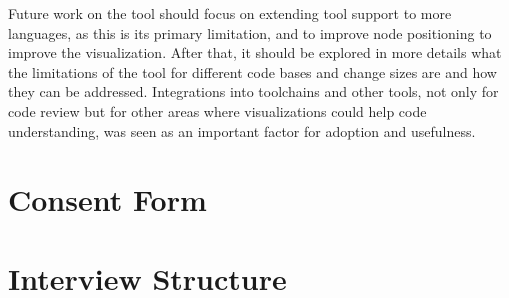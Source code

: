 \documentclass[a4paper,11pt,twoside]{article}
\theoremstyle{definition} %
\begin{document}
Future work on the tool should focus on extending tool support to more languages, as this is its primary limitation, and to improve node positioning to improve the visualization. After that, it should be explored in more details what the limitations of the tool for different code bases and change sizes are and how they can be addressed. Integrations into toolchains and other tools, not only for code review but for other areas where visualizations could help code understanding, was seen as an important factor for adoption and usefulness.


\newpage
\thispagestyle{empty} %
\cleardoublepage


\newpage
\thispagestyle{empty} %
\cleardoublepage


\appendix

\section{Consent Form} \label{App:ConsentForm}


\section{Interview Structure} \label{App:InterviewStructure}

\end{document}
